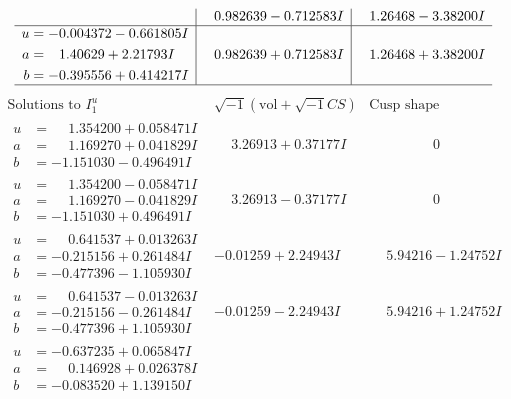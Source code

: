 \documentclass[1p]{elsarticle_modified}
\theoremstyle{definition}
\newcommand{\I}{\sqrt{-1}}
\begin{document}
$$\begin{array}{c|c|c}
 & \phantom{-}0.982639 - 0.712583 I & \phantom{-}1.26468 - 3.38200 I \\ \hline\begin{aligned}
u &= -0.004372 - 0.661805 I \\
a &= \phantom{-}1.40629 + 2.21793 I \\
b &= -0.395556 + 0.414217 I\end{aligned}
 & \phantom{-}0.982639 + 0.712583 I & \phantom{-}1.26468 + 3.38200 I\\
 \hline 
 \end{array}$$\newpage$$\begin{array}{c|c|c}  
\text{Solutions to }I^u_{1}& \I (\text{vol} + \sqrt{-1}CS) & \text{Cusp shape}\\
 \hline 
\begin{aligned}
u &= \phantom{-}1.354200 + 0.058471 I \\
a &= \phantom{-}1.169270 + 0.041829 I \\
b &= -1.151030 - 0.496491 I\end{aligned}
 & \phantom{-}3.26913 + 0.37177 I & \phantom{-0.000000 } 0 \\ \hline\begin{aligned}
u &= \phantom{-}1.354200 - 0.058471 I \\
a &= \phantom{-}1.169270 - 0.041829 I \\
b &= -1.151030 + 0.496491 I\end{aligned}
 & \phantom{-}3.26913 - 0.37177 I & \phantom{-0.000000 } 0 \\ \hline\begin{aligned}
u &= \phantom{-}0.641537 + 0.013263 I \\
a &= -0.215156 + 0.261484 I \\
b &= -0.477396 - 1.105930 I\end{aligned}
 & -0.01259 + 2.24943 I & \phantom{-}5.94216 - 1.24752 I \\ \hline\begin{aligned}
u &= \phantom{-}0.641537 - 0.013263 I \\
a &= -0.215156 - 0.261484 I \\
b &= -0.477396 + 1.105930 I\end{aligned}
 & -0.01259 - 2.24943 I & \phantom{-}5.94216 + 1.24752 I \\ \hline\begin{aligned}
u &= -0.637235 + 0.065847 I \\
a &= \phantom{-}0.146928 + 0.026378 I \\
b &= -0.083520 + 1.139150 I\end{aligned}

\end{array}$$
\end{document}
